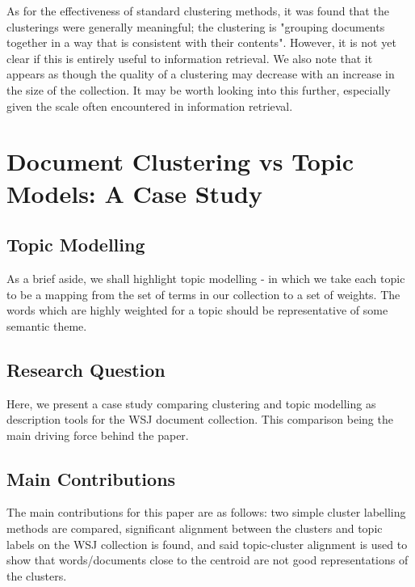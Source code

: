 \documentclass[sigconf,authorversion,nonacm]{acmart}
\begin{document}
As for the effectiveness of standard clustering methods, it was found that the clusterings were generally meaningful;
the clustering is "grouping documents together in a way that is consistent with their contents"\cite{Yuan2022}. However,
it is not yet clear if this is entirely useful to information retrieval. We also note that it appears as though the
quality of a clustering may decrease with an increase in the size of the collection. It may be worth looking into this
further, especially given the scale often encountered in information retrieval. \section{Document Clustering vs Topic
Models: A Case Study} \subsection{Topic Modelling} As a brief aside, we shall highlight topic modelling - in which we
take each topic to be a mapping from the set of terms in our collection to a set of weights. The words which are highly
weighted for a topic should be representative of some semantic theme. \subsection{Research Question} Here, we present a
case study comparing clustering and topic modelling as description tools for the WSJ document collection. This
comparison being the main driving force behind the paper. \subsection{Main Contributions} The main contributions for
this paper are as follows: two simple cluster labelling methods are compared, significant alignment between the clusters
and topic labels on the WSJ collection is found, and said topic-cluster alignment is used to show that words/documents
close to the centroid are not good representations of the clusters.
\end{document}
